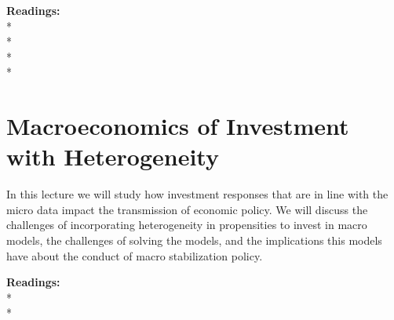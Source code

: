 \documentclass [12pt]{article}
\begin{document}
\noindent\textbf{Readings:}\\
* \\
* \\
* \\
* \\


\section{Macroeconomics of Investment with Heterogeneity}

In this lecture we will study how investment responses that are in line with the micro data impact the transmission of economic policy. We will discuss the challenges of incorporating heterogeneity in propensities to invest in macro models, the challenges of solving the models, and the implications this models have about the conduct of macro stabilization policy.

\noindent\textbf{Readings:}\\
* \\
* \\
\end{document}
